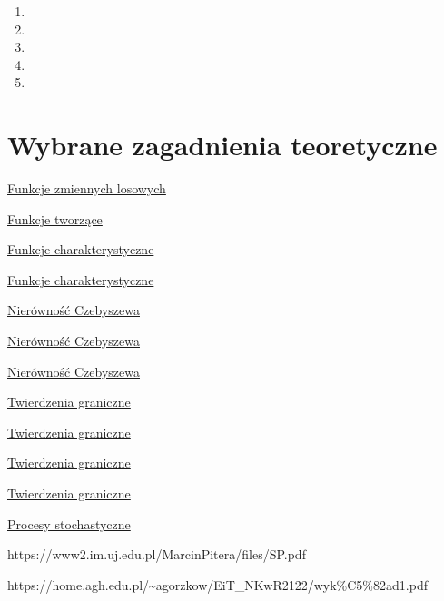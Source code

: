 \documentclass[
  letterpaper,
  DIV=11,
  numbers=noendperiod]{scrreprt}
\providecommand{\tightlist}{%
  \setlength{\itemsep}{0pt}\setlength{\parskip}{0pt}}\usepackage{longtable,booktabs,array}
\begin{document}
\begin{enumerate}
\def\labelenumi{\arabic{enumi}.}
\tightlist
\item
\item
\item
\item
\item
\end{enumerate}


\chapter{Wybrane zagadnienia
teoretyczne}\label{wybrane-zagadnienia-teoretyczne}

\hyperref[funkcje-zmiennych-losowych]{Funkcje zmiennych losowych}

\href{https://pl.wikipedia.org/wiki/Funkcja_tworz\%C4\%85ca_momenty}{Funkcje
tworzące}

\href{https://ksiegarnia.iknt.pl/uploads/files/Rachunek_prawdopodobienstwa_fragment.pdf}{Funkcje
charakterystyczne}

\href{https://pl.wikipedia.org/wiki/Funkcja_charakterystyczna_(teoria_prawdopodobie\%C5\%84stwa)}{Funkcje
charakterystyczne}

\href{https://www2.im.uj.edu.pl/LeszekPieniazek/DU/PR/test-25.html}{Nierówność
Czebyszewa}

\href{https://pl.wikipedia.org/wiki/Nier\%C3\%B3wno\%C5\%9B\%C4\%87_Czebyszewa-Bienayme}{Nierówność
Czebyszewa}

\href{http://kryba.home.amu.edu.pl/2019zimaRAP/W060.pdf}{Nierówność
Czebyszewa}

\href{http://kryba.home.amu.edu.pl/2019zimaRAP/W060.pdf}{Twierdzenia
graniczne}

\href{https://www2.im.uj.edu.pl/LeszekPieniazek/DU/PR/test-37.html}{Twierdzenia
graniczne}

\href{https://mgr-mimuw.fandom.com/wiki/Twierdzenia_graniczne_w_rachunku_prawdopodobie\%C5\%84stwa}{Twierdzenia
graniczne}

\href{http://kryba.home.amu.edu.pl/2019zimaRAP/W063.pdf}{Twierdzenia
graniczne}

\href{https://pl.wikipedia.org/wiki/Proces_stochastyczny}{Procesy
stochastyczne}

https://www2.im.uj.edu.pl/MarcinPitera/files/SP.pdf

https://home.agh.edu.pl/\textasciitilde agorzkow/EiT\_NKwR2122/wyk\%C5\%82ad1.pdf
\end{document}
